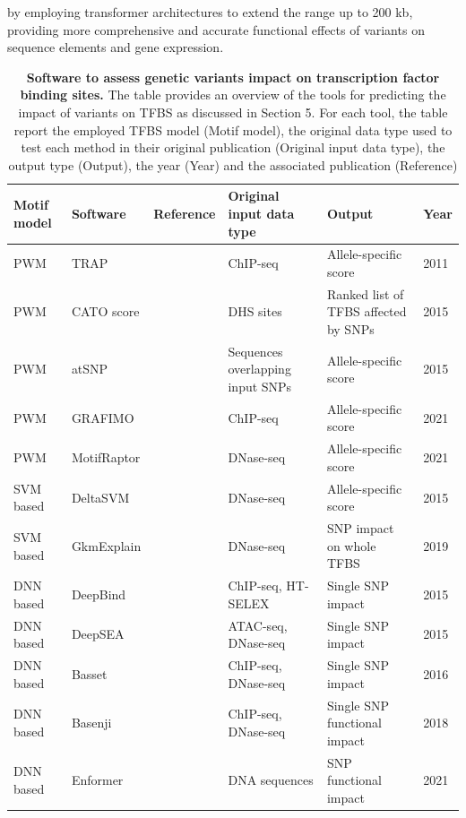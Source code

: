 \documentclass[a4paper, titlepage, openright]{book}
\newcommand{\grafimo}{GRAFIMO\xspace}
\newcommand{\motifraptor}{MotifRaptor\xspace}
\begin{document}
by employing transformer architectures to extend the range up to 200 kb, providing more comprehensive and accurate functional effects of variants on sequence elements and gene expression.
\begin{table}
	\centering
	\begin{tabular}{|p{2cm}|p{2cm}|p{3cm}|p{3cm}|p{3cm}|p{1cm}|}
		\hline
		\textbf{Motif model}& \textbf{Software}&\textbf{Reference}&\textbf{Original input data type}& \textbf{Output}& \textbf{Year} \\
		\hline
		PWM & TRAP & \citep{thomas2011transcription} & ChIP-seq & Allele-specific score & 2011 \\
		\hline
		PWM & CATO score & \citep{maurano2015large} & DHS sites & Ranked list of TFBS affected by SNPs & 2015 \\
		\hline
		PWM & atSNP & \citep{zuo2015atsnp} & Sequences overlapping input SNPs  &  Allele-specific score  & 2015 \\
		\hline
		PWM & \grafimo & \citep{tognon2021grafimo} & ChIP-seq  &  Allele-specific score  & 2021 \\
		\hline
		PWM & \motifraptor & \citep{yao2021motif} & DNase-seq  &  Allele-specific score  & 2021 \\
		\hline
		SVM based & DeltaSVM & \citep{lee2015method} & DNase-seq  &  Allele-specific score  & 2015 \\
		\hline
		SVM based & GkmExplain & \citep{shrikumar2019gkmexplain} & DNase-seq  &  SNP impact on whole TFBS  & 2019 \\
		\hline
		DNN based & DeepBind & \citep{alipanahi2015predicting} & ChIP-seq, HT-SELEX &  Single SNP impact  & 2015 \\
		\hline
		DNN based & DeepSEA & \citep{zhou2015predicting} & ATAC-seq, DNase-seq  &  Single SNP impact  & 2015 \\
		\hline
		DNN based & Basset & \citep{kelley2016basset} & ChIP-seq, DNase-seq  &  Single SNP impact  & 2016 \\
		\hline
		DNN based & Basenji & \citep{kelley2018sequential} & ChIP-seq, DNase-seq  &  Single SNP functional impact  & 2018 \\
		\hline
		DNN based & Enformer & \citep{avsec2021effective} & DNA sequences  &  SNP functional impact  & 2021 \\
		\hline
	\end{tabular}
	\caption[Software to assess genetic variants impact on transcription factor binding sites.]{\textbf{Software to assess genetic variants impact on transcription factor binding sites.} The table provides an overview of the tools for predicting the impact of variants on TFBS as discussed in Section 5. For each tool, the table report the employed TFBS model (Motif model), the original data type used to test each method in their original publication (Original input data type), the output type (Output), the year (Year) and the associated publication (Reference)}
	\label{table:tfvariants}
\end{table}
\end{document}
